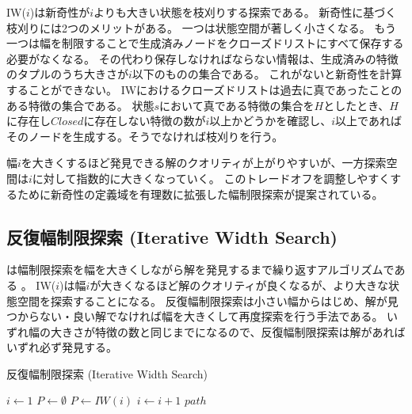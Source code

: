 IW($i$)は新奇性が$i$よりも大きい状態を枝刈りする探索である。
新奇性に基づく枝刈りには2つのメリットがある。
一つは状態空間が著しく小さくなる。
もう一つは幅を制限することで生成済みノードをクローズドリストにすべて保存する必要がなくなる。
その代わり保存しなければならない情報は、生成済みの特徴のタプルのうち大きさが$i$以下のものの集合である。
これがないと新奇性を計算することができない。
IWにおけるクローズドリストは過去に真であったことのある特徴の集合である。
状態$s$において真である特徴の集合を$H$としたとき、$H$に存在し$Closed$に存在しない特徴の数が$i$以上かどうかを確認し、$i$以上であればそのノードを生成する。そうでなければ枝刈りを行う。

幅$i$を大きくするほど発見できる解のクオリティが上がりやすいが、一方探索空間は$i$に対して指数的に大きくなっていく。
このトレードオフを調整しやすくするために新奇性の定義域を有理数に拡張した幅制限探索が提案されている\cite{geffner2015}。


\subsection{反復幅制限探索 (Iterative Width Search)}
\label{sec:iterative-width-search}

は幅制限探索を幅を大きくしながら解を発見するまで繰り返すアルゴリズムである \cite{lipovetzkyg12}。
IW($i$)は幅$i$が大きくなるほど解のクオリティが良くなるが、より大きな状態空間を探索することになる。
反復幅制限探索は小さい幅からはじめ、解が見つからない・良い解でなければ幅を大きくして再度探索を行う手法である。
いずれ幅の大きさが特徴の数と同じまでになるので、反復幅制限探索は解があればいずれ必ず発見する。

\begin{algorithm}
\caption{反復幅制限探索 (Iterative Width Search)}
$i \leftarrow 1$\;
$P \leftarrow \emptyset$\;
	 {
		$P \leftarrow IW(i)$\;
		$i \leftarrow i + 1$\;
	}
	\Return $path$
\end{algorithm}

